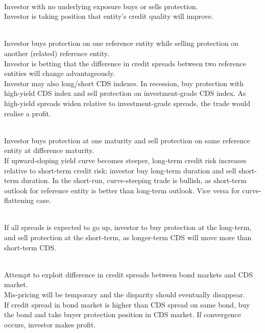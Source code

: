 \begin{remark} \\
Investor with no underlying exposure buys or sells protection.\\
Investor is taking position that entity's credit quality will improve.
\end{remark}

\begin{remark} \\
Investor buys protection on one reference entity while selling protection on another (related) reference entity.\\
Investor is betting that the difference in credit spreads between two reference entities will change advantageously.\\
Investor may also long/short CDS indexes. In recession, buy protection with high-yield CDS index and sell protection on investment-grade CDS index. As high-yield spreads widen relative to investment-grade spreads, the trade would realise a profit.
\end{remark}

\begin{remark} \\
Investor buys protection at one maturity and sell protection on same reference entity at difference maturity.\\
If upward-sloping yield curve becomes steeper, long-term credit risk increases relative to short-term credit risk; investor buy long-term duration and sell short-term duration. In the short-run, curve-steeping trade is bullish, as short-term outlook for reference entity is better than long-term outlook. Vice versa for curve-flattening case.
\end{remark}

\begin{remark} \\
If all spreads is expected to go up, investor to buy protection at the long-term, and sell protection at the short-term, as longer-term CDS will move more than short-term CDS.
\end{remark}

\begin{remark} \\
Attempt to exploit difference in credit spreads between bond markets and CDS market.\\
Mis-pricing will be temporary and the disparity should eventually disappear.\\
If credit spread in bond market is higher than CDS spread on same bond, buy the bond and take buyer protection position in CDS market. If convergence occurs, investor makes profit.
\end{remark}

